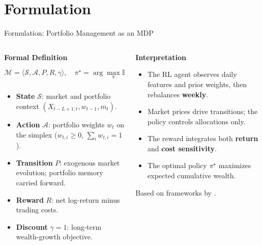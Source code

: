 \documentclass[aspectratio=169]{beamer}
\begin{document}
\section{Formulation}

\begin{frame}{Formulation: Portfolio Management as an MDP}
\small

\begin{columns}[T,totalwidth=\textwidth]
  \begin{column}{0.55\textwidth}
    \textbf{Formal Definition}
    {\footnotesize
    \[
      \mathcal{M} = \langle \mathcal{S}, \mathcal{A}, P, R, \gamma \rangle, \quad
      \pi^\star = \arg\max_\pi 
      \mathbb{E}_\pi \!\left[\sum_{t=1}^{T} r_t \right].
    \]
    }
    \begin{itemize}\setlength{\itemsep}{2pt}
      \item \textbf{State} $\mathcal{S}$: market and portfolio context $(X_{t-L+1:t}, w_{t-1}, m_t)$.
      \item \textbf{Action} $\mathcal{A}$: portfolio weights $w_t$ on the simplex ($w_{t,i} \ge 0$, $\sum_i w_{t,i}=1$).
      \item \textbf{Transition} $P$: exogenous market evolution; portfolio memory carried forward.
      \item \textbf{Reward} $R$: net log-return minus trading costs.
      \item \textbf{Discount} $\gamma = 1$: long-term wealth-growth objective.
    \end{itemize}
  \end{column}

  \begin{column}{0.4\textwidth}
    \textbf{Interpretation}
    \begin{itemize}\setlength{\itemsep}{2pt}
      \item The RL agent observes daily features and prior weights, then rebalances \textbf{weekly}.
      \item Market prices drive transitions; the policy controls allocations only.
      \item The reward integrates both \textbf{return} and \textbf{cost sensitivity}.
      \item The optimal policy $\pi^\star$ maximizes expected cumulative wealth.
    \end{itemize}
    \footnotesize Based on frameworks by \citep{jiang2017framework,jiang2017cryptocurrency,cui2023cvar}.
  \end{column}
\end{columns}

\end{frame}
\end{document}
